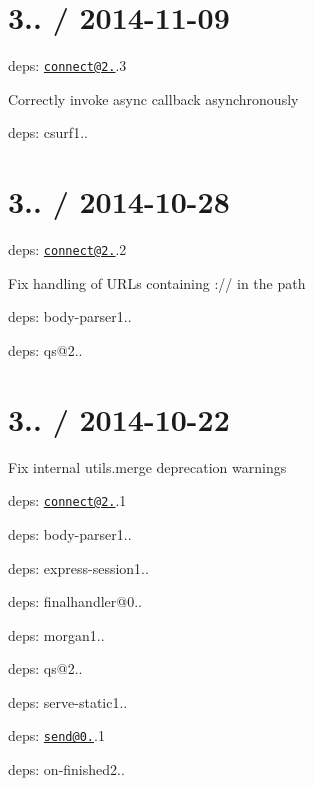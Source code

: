 {\ttfamily \section*{3.. / 2014-\/11-\/09 }}

{\ttfamily }

{\ttfamily 
\begin{DoxyItemize}
\item deps\+: \href{mailto:connect@2.27}{\tt connect@2.}.3
\begin{DoxyItemize}
\item Correctly invoke async callback asynchronously
\item deps\+: csurf1..
\end{DoxyItemize}
\end{DoxyItemize}}

{\ttfamily \section*{3.. / 2014-\/10-\/28 }}

{\ttfamily }

{\ttfamily 
\begin{DoxyItemize}
\item deps\+: \href{mailto:connect@2.27}{\tt connect@2.}.2
\begin{DoxyItemize}
\item Fix handling of U\+R\+Ls containing {\ttfamily \+://} in the path
\item deps\+: body-\/parser1..
\item deps\+: qs@2..
\end{DoxyItemize}
\end{DoxyItemize}}

{\ttfamily \section*{3.. / 2014-\/10-\/22 }}

{\ttfamily }

{\ttfamily 
\begin{DoxyItemize}
\item Fix internal {\ttfamily utils.\+merge} deprecation warnings
\item deps\+: \href{mailto:connect@2.27}{\tt connect@2.}.1
\begin{DoxyItemize}
\item deps\+: body-\/parser1..
\item deps\+: express-\/session1..
\item deps\+: finalhandler@0..
\item deps\+: morgan1..
\item deps\+: qs@2..
\item deps\+: serve-\/static1..
\end{DoxyItemize}
\item deps\+: \href{mailto:send@0.10}{\tt send@0.}.1
\begin{DoxyItemize}
\item deps\+: on-\/finished2..
\end{DoxyItemize}
\end{DoxyItemize}}

